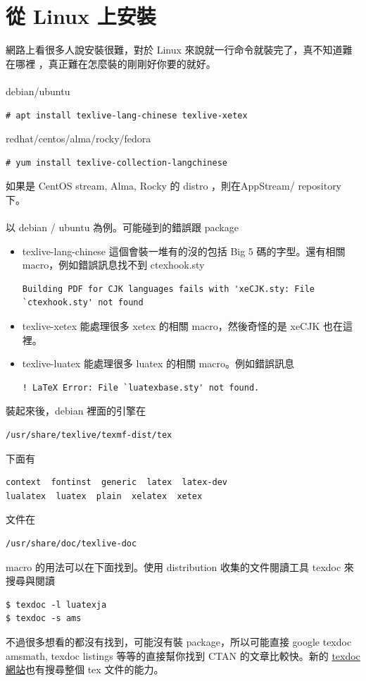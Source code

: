 \section{從 Linux 上安裝}
網路上看很多人說安裝很難，對於 Linux 來說就一行命令就裝完了，真不知道難在哪裡
，真正難在怎麼裝的剛剛好你要的就好。
\\\\
debian/ubuntu
\begin{verbatim}
# apt install texlive-lang-chinese texlive-xetex
\end{verbatim}
redhat/centos/alma/rocky/fedora
\begin{verbatim}
# yum install texlive-collection-langchinese
\end{verbatim}
如果是 CentOS stream, Alma, Rocky 的 distro ，則在AppStream/ repository 下。
\\\\
以 debian / ubuntu 為例。可能碰到的錯誤跟 package
\begin{itemize}
\item texlive-lang-chinese 這個會裝一堆有的沒的包括 Big 5 碼的字型。還有相關
 macro，例如錯誤訊息找不到 ctexhook.sty

\begin{verbatim}
Building PDF for CJK languages fails with 'xeCJK.sty: File `ctexhook.sty' not found
\end{verbatim}

\item texlive-xetex 能處理很多 xetex 的相關 macro，然後奇怪的是 xeCJK 也在這裡。
\item texlive-luatex 能處理很多 luatex 的相關 macro。例如錯誤訊息

\begin{verbatim}
! LaTeX Error: File `luatexbase.sty' not found.
\end{verbatim}

\end{itemize}
裝起來後，debian 裡面的引擎在
\begin{verbatim}
/usr/share/texlive/texmf-dist/tex
\end{verbatim}
下面有
\begin{verbatim}
context  fontinst  generic  latex  latex-dev  
lualatex  luatex  plain  xelatex  xetex
\end{verbatim}
文件在
\begin{verbatim}
/usr/share/doc/texlive-doc
\end{verbatim}
macro 的用法可以在下面找到。使用 distribution 收集的文件閱讀工具 texdoc 來搜尋與閱讀
\begin{verbatim}
$ texdoc -l luatexja
$ texdoc -s ams
\end{verbatim}
不過很多想看的都沒有找到，可能沒有裝 package，所以可能直接 google texdoc amsmath,
texdoc listings 等等的直接幫你找到 CTAN 的文章比較快。新的 
\href{https://texdoc.org}{texdoc 網站}也有搜尋整個 tex 文件的能力。

